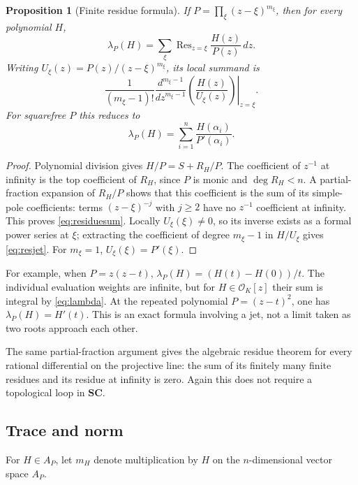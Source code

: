 \documentclass[11pt,letterpaper]{article}
\numberwithin{equation}{section}
\newtheorem{proposition}[theorem]{Proposition}
\theoremstyle{definition}
\theoremstyle{remark}\newtheorem{remark}[theorem]{Remark}
\newcommand{\SC}{\mathbf{SC}}
\newcommand{\OO}{\mathcal O}
\newcommand{\Res}{\operatorname{Res}}
\begin{document}
\begin{proposition}[Finite residue formula]\label{prop:localresidue}
If $P=\prod_\xi(z-\xi)^{m_\xi}$, then for every polynomial $H$,
\begin{equation}\label{eq:residuesum}
 \lambda_P(H)=\sum_\xi\Res_{z=\xi}\frac{H(z)}{P(z)}\,dz.
\end{equation}
Writing $U_\xi(z)=P(z)/(z-\xi)^{m_\xi}$, its local summand is
\begin{equation}\label{eq:resjet}
 \frac1{(m_\xi-1)!}
 \left.\frac{d^{m_\xi-1}}{dz^{m_\xi-1}}
       \left(\frac{H(z)}{U_\xi(z)}\right)\right|_{z=\xi}.
\end{equation}
For squarefree $P$ this reduces to
\begin{equation}\label{eq:lagrangeresidue}
 \lambda_P(H)=\sum_{i=1}^n\frac{H(\alpha_i)}{P'(\alpha_i)}.
\end{equation}
\end{proposition}
\begin{proof}
Polynomial division gives $H/P=S+R_H/P$. The coefficient of $z^{-1}$
at infinity is the top coefficient of $R_H$, since $P$ is monic and
$\deg R_H<n$. A partial-fraction expansion of $R_H/P$ shows that
this coefficient is the sum of its simple-pole coefficients: terms
$(z-\xi)^{-j}$ with $j\ge2$ have no $z^{-1}$ coefficient at infinity.
This proves \eqref{eq:residuesum}. Locally $U_\xi(\xi)\ne0$, so its
inverse exists as a formal power series at $\xi$; extracting the
coefficient of degree $m_\xi-1$ in $H/U_\xi$ gives
\eqref{eq:resjet}. For $m_\xi=1$, $U_\xi(\xi)=P'(\xi)$.
\end{proof}
For example, when $P=z(z-t)$,
$\lambda_P(H)=(H(t)-H(0))/t$. The individual evaluation weights are
infinite, but for $H\in\OO_K[z]$ their sum is integral by
\eqref{eq:lambda}. At the repeated polynomial $P=(z-t)^2$, one has
$\lambda_P(H)=H'(t)$. This is an exact formula involving a jet, not
a limit taken as two roots approach each other.

The same partial-fraction argument gives the algebraic residue theorem
for every rational differential on the projective line: the sum of
its finitely many finite residues and its residue at infinity is zero.
Again this does not require a topological loop in $\SC$.

\subsection{Trace and norm}
For $H\in A_P$, let $m_H$ denote multiplication by $H$ on the
$n$-dimensional vector space $A_P$.
\end{document}
